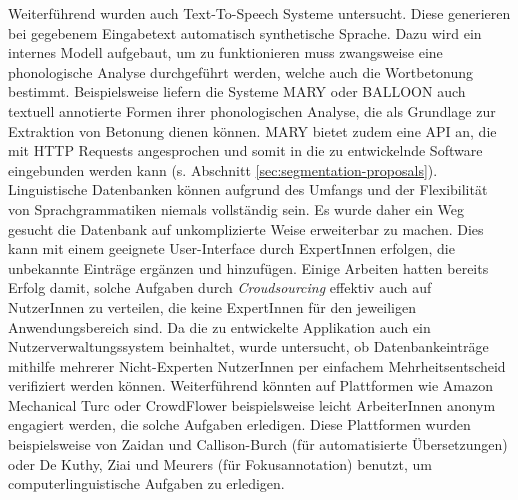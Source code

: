 Weiterführend wurden auch Text-To-Speech Systeme untersucht. Diese generieren bei gegebenem Eingabetext automatisch synthetische Sprache. Dazu wird ein internes Modell aufgebaut, um zu funktionieren muss zwangsweise eine phonologische Analyse durchgeführt werden, welche auch die Wortbetonung bestimmt. Beispielsweise liefern die Systeme MARY\cite{Schroder2003} oder BALLOON\cite{Reichel2012} auch textuell annotierte Formen ihrer phonologischen Analyse, die als Grundlage zur Extraktion von Betonung dienen können. MARY bietet zudem eine API an, die mit HTTP Requests angesprochen und somit in die zu entwickelnde Software eingebunden werden kann (s. Abschnitt \ref{sec:segmentation-proposals}).\\

Linguistische Datenbanken können aufgrund des Umfangs und der Flexibilität von Sprachgrammatiken niemals vollständig sein. Es wurde daher ein Weg gesucht die Datenbank auf unkomplizierte Weise erweiterbar zu machen. Dies kann mit einem geeignete User-Interface durch ExpertInnen erfolgen, die unbekannte Einträge ergänzen und hinzufügen. Einige Arbeiten hatten bereits Erfolg damit, solche Aufgaben durch \textit{Croudsourcing} effektiv auch auf NutzerInnen zu verteilen, die keine ExpertInnen für den jeweiligen Anwendungsbereich sind. Da die zu entwickelte Applikation auch ein Nutzerverwaltungssystem beinhaltet, wurde untersucht, ob Datenbankeinträge mithilfe mehrerer Nicht-Experten NutzerInnen per einfachem Mehrheitsentscheid verifiziert werden können. Weiterführend könnten auf Plattformen wie Amazon Mechanical Turc oder CrowdFlower beispielsweise leicht ArbeiterInnen anonym engagiert werden, die solche Aufgaben erledigen\cite{Snow2008}. Diese Plattformen wurden beispielsweise von Zaidan und Callison-Burch (für automatisierte Übersetzungen)\cite{Zaidan2011} oder De Kuthy, Ziai und Meurers\cite{Meurers2015} (für Fokusannotation) benutzt, um computerlinguistische Aufgaben zu erledigen.